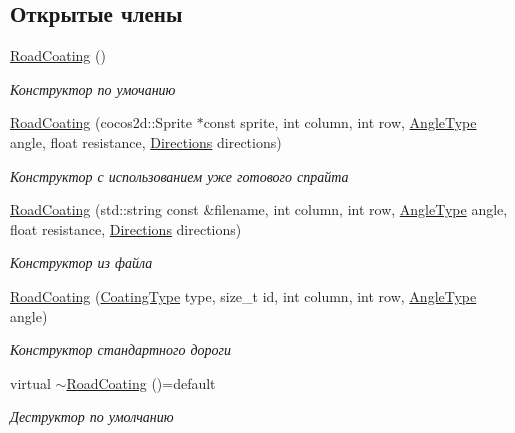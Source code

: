 \subsection*{Открытые члены}
\begin{DoxyCompactItemize}
\item 
\mbox{\label{classrtm_1_1_road_coating_a0069c9e169fd982c4b5a5fa7f00145c6}} 
\hyperlink{classrtm_1_1_road_coating_a0069c9e169fd982c4b5a5fa7f00145c6}{Road\+Coating} ()
\begin{DoxyCompactList}\small\item\em Конструктор по умочанию \end{DoxyCompactList}\item 
\hyperlink{classrtm_1_1_road_coating_a3daed8c05e6901a8e2aedd5bd8b10e88}{Road\+Coating} (cocos2d\+::\+Sprite $\ast$const sprite, int column, int row, \hyperlink{namespacertm_a69dc82b16a0148c10962caa83d930f89}{Angle\+Type} angle, float resistance, \hyperlink{namespacertm_a4776fbfe59834ff1a16838ad6735b69a}{Directions} directions)
\begin{DoxyCompactList}\small\item\em Конструктор с использованием уже готового спрайта \end{DoxyCompactList}\item 
\hyperlink{classrtm_1_1_road_coating_ab127c8e986544a6e8bdf95ed8f302b7e}{Road\+Coating} (std\+::string const \&filename, int column, int row, \hyperlink{namespacertm_a69dc82b16a0148c10962caa83d930f89}{Angle\+Type} angle, float resistance, \hyperlink{namespacertm_a4776fbfe59834ff1a16838ad6735b69a}{Directions} directions)
\begin{DoxyCompactList}\small\item\em Конструктор из файла \end{DoxyCompactList}\item 
\hyperlink{classrtm_1_1_road_coating_a0734f50e7884ed3cad83d0a6a16d663e}{Road\+Coating} (\hyperlink{namespacertm_aecd3929e64cd461eb3555b611f6fad95}{Coating\+Type} type, size\+\_\+t id, int column, int row, \hyperlink{namespacertm_a69dc82b16a0148c10962caa83d930f89}{Angle\+Type} angle)
\begin{DoxyCompactList}\small\item\em Конструктор стандартного дороги \end{DoxyCompactList}\item 
\mbox{\label{classrtm_1_1_road_coating_a49f9bc08088af98a0cccdf8db296ba0f}} 
virtual \hyperlink{classrtm_1_1_road_coating_a49f9bc08088af98a0cccdf8db296ba0f}{$\sim$\+Road\+Coating} ()=default
\begin{DoxyCompactList}\small\item\em Деструктор по умолчанию \end{DoxyCompactList}\end{DoxyCompactItemize}
